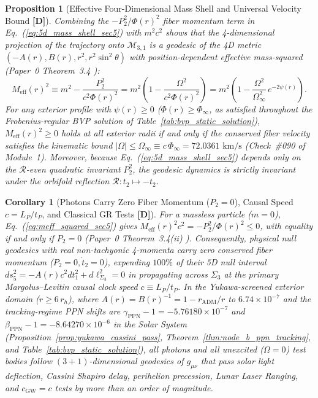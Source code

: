 \documentclass[11pt,a4paper]{article}
\newcommand{\catD}{\textbf{\textcolor{blue!75!black}{[D]}}}
\newtheorem{proposition}[theorem]{Proposition}
\newtheorem{corollary}[theorem]{Corollary}
\theoremstyle{definition}
\theoremstyle{remark}
\begin{document}
\begin{proposition}[Effective Four-Dimensional Mass Shell and Universal Velocity Bound \catD]
\label{prop:effective_mass_bound}
Combining the $-P_2^2/\Phi(r)^2$ fiber momentum term in Eq.~(\ref{eq:5d_mass_shell_sec5}) with $m^2 c^2$ shows that the 4-dimensional projection of the trajectory onto $\mathcal{M}_{3,1}$ is a geodesic of the 4D metric $(-A(r), B(r), r^2, r^2\sin^2\theta)$ with position-dependent effective mass-squared (Paper~0 Theorem~3.4 \cite{JV_Paper0}):
\begin{equation}
  M_{\text{eff}}(r)^2 \equiv m^2 - \frac{P_2^2}{c^2\Phi(r)^2} = m^2\left(1 - \frac{\Omega^2}{c^2\Phi(r)^2}\right) = m^2\left(1 - \frac{\Omega^2}{\Omega_{\infty}^2}\,e^{-2\psi(r)}\right).
  \label{eq:meff_squared_sec5}
\end{equation}
For any exterior profile with $\psi(r) \ge 0$ ($\Phi(r) \ge \Phi_{\infty}$, as satisfied throughout the Frobenius-regular BVP solution of Table~\ref{tab:bvp_static_solution}), $M_{\text{eff}}(r)^2 \ge 0$ holds at all exterior radii if and only if the conserved fiber velocity satisfies the kinematic bound $|\Omega| \le \Omega_{\infty} \equiv c\,\Phi_{\infty} = 72.0361\text{ km/s}$ (Check~\#090 of Module~1). Moreover, because Eq.~(\ref{eq:5d_mass_shell_sec5}) depends only on the $\mathcal{R}$-even quadratic invariant $P_2^2$, the geodesic dynamics is strictly invariant under the orbifold reflection $\mathcal{R}: t_2 \mapsto -t_2$.
\end{proposition}

\begin{corollary}[Photons Carry Zero Fiber Momentum ($P_2 = 0$), Causal Speed $c = L_P/t_P$, and Classical GR Tests \catD]
\label{cor:photons_zero_p2}
For a massless particle ($m = 0$), Eq.~(\ref{eq:meff_squared_sec5}) gives $M_{\text{eff}}(r)^2 c^2 = -P_2^2/\Phi(r)^2 \le 0$, with equality if and only if $P_2 = 0$ (Paper~0 Theorem~3.4(ii) \cite{JV_Paper0}). Consequently, physical null geodesics with real non-tachyonic 4-momenta carry zero conserved fiber momentum ($P_2 = 0, \dot{t}_2 = 0$), expending $100\%$ of their 5D null interval $ds_5^2 = -A(r)c^2 dt_1^2 + d\ell_{\Sigma_3}^2 = 0$ in propagating across $\Sigma_3$ at the primary Margolus--Levitin causal clock speed $c \equiv L_P/t_P$. In the Yukawa-screened exterior domain ($r \ge 6\,r_h$), where $A(r) = B(r)^{-1} = 1 - r_{\text{ADM}}/r$ to $6.74 \times 10^{-7}$ and the tracking-regime PPN shifts are $\gamma_{\text{PPN}} - 1 = -5.76180 \times 10^{-7}$ and $\beta_{\text{PPN}} - 1 = -8.64270 \times 10^{-6}$ in the Solar System (Proposition~\ref{prop:yukawa_cassini_pass}, Theorem~\ref{thm:node_b_ppn_tracking}, and Table~\ref{tab:bvp_static_solution}), all photons and all unexcited ($\Omega = 0$) test bodies follow $(3+1)$-dimensional geodesics of $g_{\mu\nu}$ that pass solar light deflection, Cassini Shapiro delay, perihelion precession, Lunar Laser Ranging, and $c_{\text{GW}} = c$ tests by more than an order of magnitude.
\end{corollary}
\end{document}
